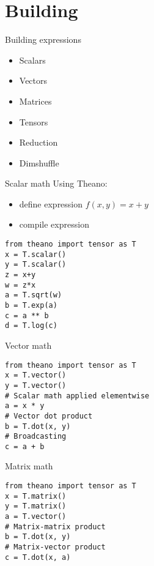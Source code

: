 \documentclass[utf8x]{beamer}
\begin{document}
\section{Building}
\begin{frame}{Building expressions}
  \begin{itemize}
  \item Scalars
  \item Vectors
  \item Matrices
  \item Tensors
  \item Reduction
  \item Dimshuffle
  \end{itemize}
\end{frame}

\begin{frame}[fragile]{Scalar math}
  Using Theano:
  \begin{itemize}
  \item define expression $f(x,y) = x + y$
  \item compile expression
  \end{itemize}
\begin{lstlisting}
from theano import tensor as T
x = T.scalar()
y = T.scalar()
z = x+y
w = z*x
a = T.sqrt(w)
b = T.exp(a)
c = a ** b
d = T.log(c)
\end{lstlisting}
\end{frame}

\begin{frame}[fragile]{Vector math}
\begin{lstlisting}
from theano import tensor as T
x = T.vector()
y = T.vector()
# Scalar math applied elementwise
a = x * y
# Vector dot product
b = T.dot(x, y)
# Broadcasting
c = a + b
\end{lstlisting}
\end{frame}

\begin{frame}[fragile]{Matrix math}
\begin{lstlisting}
from theano import tensor as T
x = T.matrix()
y = T.matrix()
a = T.vector()
# Matrix-matrix product
b = T.dot(x, y)
# Matrix-vector product
c = T.dot(x, a)
\end{lstlisting}
\end{frame}
\end{document}
